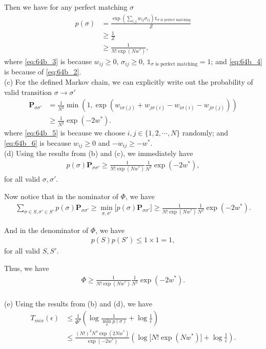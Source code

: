 \documentclass{article}
\newcommand{\qeds}{\hfill\qedsymbol}
\newcommand{\bm}{\mathbf}
\begin{document}
Then we have for any perfect matching $\sigma$
\begin{align}
	p(\sigma) &= \frac{\exp\left(\sum_{i,j}w_{ij}\sigma_{ij}\right)\mathds{1}_{\sigma \text{ is perfect matching}}}{Z}\\
	& \geq \frac{1}{Z} \label{eq:64b_3}\\
	& \geq \frac{1}{N!\exp\left(Nw^*\right)}, \label{eq:64b_4}
\end{align}
where \eqref{eq:64b_3} is because $w_{ij} \geq 0$, $\sigma_{ij} \geq 0$, $\mathds{1}_{\sigma \text{ is perfect matching}} = 1$; and \eqref{eq:64b_4} is because of \eqref{eq:64b_2}. \qeds
\\

\noindent
(c) For the defined Markov chain, we can explicitly write out the probability of valid
transition $\sigma \to \sigma'$
\begin{align}
	\bm{P}_{\sigma \sigma'} &= \frac{1}{N^2}\min(1, \exp(w_{i\sigma(j)} + w_{j\sigma(i)} - w_{i\sigma(i)} - w_{j\sigma(j)}))\label{eq:64b_5}\\
	&\geq \frac{1}{N^2}\exp(-2w^*). \label{eq:64b_6}
\end{align}
where \eqref{eq:64b_5} is because we choose $i, j \in \{1, 2, \cdots, N\}$ randomly; and 
\eqref{eq:64b_6} is because $w_{ij} \geq 0$ and $-w_{ij} \geq -w^*$. \qeds
\\

\noindent
(d) Using the results from (b) and (c), we immediately have
\begin{align*}
	p(\sigma)\bm{P}_{\sigma\sigma'} \geq \frac{1}{N!\exp\left(Nw^*\right)}\frac{1}{N^2}\exp(-2w^*),
\end{align*}
for all valid $\sigma, \sigma'$.

Now notice that in the nominator of $\Phi$, we have
\begin{align*}
	\sum_{\sigma\in S, \sigma'\in S'} p(\sigma)\bm{P}_{\sigma\sigma'} \geq \min_{\sigma, \sigma'}\bigg[ p(\sigma)\bm{P}_{\sigma\sigma'}\bigg] \geq \frac{1}{N!\exp\left(Nw^*\right)}\frac{1}{N^2}\exp(-2w^*).
\end{align*}

And in the denominator of $\Phi$, we have
\begin{align*}
p(S)p(S') \leq 1 \times 1 = 1,
\end{align*} for all valid $S, S'$.

Thus, we have
\begin{align*}
	\Phi \geq \frac{1}{N!\exp\left(Nw^*\right)}\frac{1}{N^2}\exp(-2w^*).
\end{align*}\qeds
\\

\noindent
(e) Using the results from (b) and (d), we have
\begin{align*}
	T_{mix}(\epsilon) &\leq \frac{1}{\Phi^2}\left(\log\frac{1}{\min_\sigma p (\sigma)} + \log\frac{1}{\epsilon}\right)\\
	&\leq \frac{(N!)^2 N^4 \exp(2Nw^*)}{\exp(-2w^*)}\left(\log\big[N!\exp(N w^*)\big] + \log\frac{1}{\epsilon}\right).
\end{align*}
\end{document}
